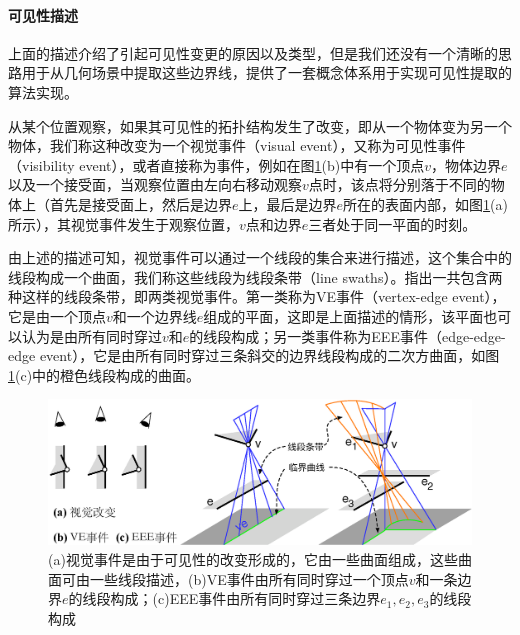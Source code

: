 \paragraph{可见性描述}
上面的描述介绍了引起可见性变更的原因以及类型，但是我们还没有一个清晰的思路用于从几何场景中提取这些边界线，\cite{a:ComputingTheAspectGraphforLineDrawingsofPolyhedralObjects,a:EfficientlyComputingandRepresentingAspectGraphsofPolyhedralObjects}提供了一套概念体系用于实现可见性提取的算法实现。

从某个位置观察，如果其可见性的拓扑结构发生了改变，即从一个物体变为另一个物体，我们称这种改变为一个视觉事件（visual event），又称为可见性事件（visibility event），或者直接称为事件，例如在图\ref{f:r-visual-events}(b)中有一个顶点$v$，物体边界$e$以及一个接受面，当观察位置由左向右移动观察$v$点时，该点将分别落于不同的物体上（首先是接受面上，然后是边界$e$上，最后是边界$e$所在的表面内部，如图\ref{f:r-visual-events}(a)所示），其视觉事件发生于观察位置，$v$点和边界$e$三者处于同一平面的时刻。

由上述的描述可知，视觉事件可以通过一个线段的集合来进行描述，这个集合中的线段构成一个曲面，我们称这些线段为线段条带（line swaths）。\cite{a:ComputingTheAspectGraphforLineDrawingsofPolyhedralObjects,a:EfficientlyComputingandRepresentingAspectGraphsofPolyhedralObjects}指出一共包含两种这样的线段条带，即两类视觉事件。第一类称为VE事件（vertex-edge event），它是由一个顶点$v$和一个边界线$e$组成的平面，这即是上面描述的情形，该平面也可以认为是由所有同时穿过$v$和$e$的线段构成；另一类事件称为EEE事件（edge-edge-edge event），它是由所有同时穿过三条斜交的边界线段构成的二次方曲面，如图\ref{f:r-visual-events}(c)中的橙色线段构成的曲面。

\begin{figure}
	\includegraphics[width=1.\textwidth]{figures/r/visual-events}
	\caption{(a)视觉事件是由于可见性的改变形成的，它由一些曲面组成，这些曲面可由一些线段描述，(b)VE事件由所有同时穿过一个顶点$v$和一条边界$e$的线段构成；(c)EEE事件由所有同时穿过三条边界$e_1,e_2,e_3$的线段构成}
	\label{f:r-visual-events}
\end{figure}

